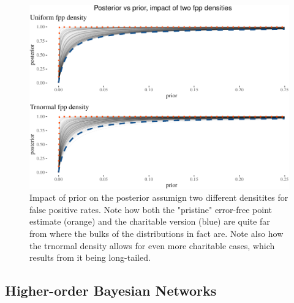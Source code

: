 \documentclass[
  10pt,
  dvipsnames,enabledeprecatedfontcommands]{scrartcl}
\begin{document}
\begin{figure}[H]

\begin{center}\includegraphics[width=0.8\linewidth]{chapter-outline_files/figure-latex/fig:fplinesPlot2-1} \end{center}
\caption{Impact of prior on the posterior assumign two different densitites for false positive rates. Note how both the "pristine" error-free point estimate (orange) and the charitable version (blue) are quite far from where the bulks of the distributions in fact are. Note also how the trnormal density allows for even more charitable cases, which results from it being long-tailed.}
\label{fig:fplinesPlot}
\end{figure}

\hypertarget{higher-order-bayesian-networks}{%
\subsection{Higher-order Bayesian
Networks}\label{higher-order-bayesian-networks}}
\end{document}
